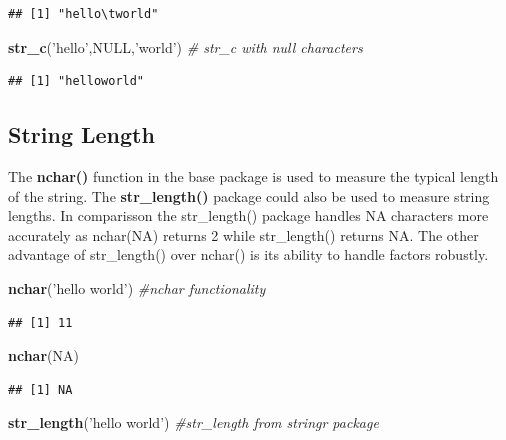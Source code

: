 \documentclass[]{book}
\newenvironment{Shaded}{\begin{snugshade}}{\end{snugshade}}
\newcommand{\KeywordTok}[1]{\textcolor[rgb]{0.13,0.29,0.53}{\textbf{{#1}}}}
\newcommand{\StringTok}[1]{\textcolor[rgb]{0.31,0.60,0.02}{{#1}}}
\newcommand{\CommentTok}[1]{\textcolor[rgb]{0.56,0.35,0.01}{\textit{{#1}}}}
\newcommand{\OtherTok}[1]{\textcolor[rgb]{0.56,0.35,0.01}{{#1}}}
\newcommand{\NormalTok}[1]{{#1}}
\begin{document}
\begin{verbatim}
## [1] "hello\tworld"
\end{verbatim}

\begin{Shaded}
\begin{Highlighting}[]
\KeywordTok{str_c}\NormalTok{(}\StringTok{'hello'}\NormalTok{,}\OtherTok{NULL}\NormalTok{,}\StringTok{'world'}\NormalTok{) }\CommentTok{# str_c with null characters}
\end{Highlighting}
\end{Shaded}

\begin{verbatim}
## [1] "helloworld"
\end{verbatim}

\subsection{String Length}\label{string-length}

The \textbf{nchar()} function in the base package is used to measure the
typical length of the string. The \textbf{str\_length()} package could
also be used to measure string lengths. In comparisson the str\_length()
package handles NA characters more accurately as nchar(NA) returns 2
while str\_length() returns NA. The other advantage of str\_length()
over nchar() is its ability to handle factors robustly.

\begin{Shaded}
\begin{Highlighting}[]
\KeywordTok{nchar}\NormalTok{(}\StringTok{'hello world'}\NormalTok{) }\CommentTok{#nchar functionality}
\end{Highlighting}
\end{Shaded}

\begin{verbatim}
## [1] 11
\end{verbatim}

\begin{Shaded}
\begin{Highlighting}[]
\KeywordTok{nchar}\NormalTok{(}\OtherTok{NA}\NormalTok{)}
\end{Highlighting}
\end{Shaded}

\begin{verbatim}
## [1] NA
\end{verbatim}

\begin{Shaded}
\begin{Highlighting}[]
\KeywordTok{str_length}\NormalTok{(}\StringTok{'hello world'}\NormalTok{) }\CommentTok{#str_length from stringr package}
\end{Highlighting}
\end{Shaded}
\end{document}
